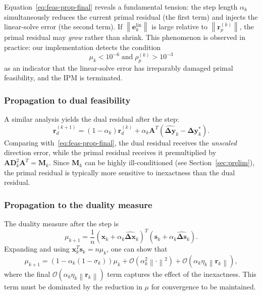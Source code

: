 \documentclass[11pt,twoside]{article}
\newcommand{\bA}{\mathbf{A}}
\newcommand{\bx}{\mathbf{x}}
\newcommand{\by}{\mathbf{y}}
\newcommand{\bs}{\mathbf{s}}
\newcommand{\bD}{\mathbf{D}}
\newcommand{\be}{\mathbf{e}}
\newcommand{\bM}{\mathbf{M}}
\newcommand{\br}{\mathbf{r}}
\newcommand{\bDelta}{\mathbf{\Delta}}
\newcommand{\cO}{\mathcal{O}}
\newcommand{\norm}[1]{\left\lVert#1\right\rVert}
\begin{document}
Equation~\eqref{eq:feas-prop-final} reveals a fundamental tension: the
step length $\alpha_k$ simultaneously reduces the current primal residual
(the first term) and injects the linear-solve error (the second term).
If $\norm{\be_k^{\text{lin}}}$ is large relative to $\norm{\br_p^{(k)}}$,
the primal residual may \emph{grow} rather than shrink.  This phenomenon is
observed in practice: our implementation detects the condition
\begin{equation}
  \mu_k < 10^{-6} \;\text{and}\; \rho_p^{(k)} > 10^{-3}
  \label{eq:feas-loss}
\end{equation}
as an indicator that the linear-solve error has irreparably damaged primal
feasibility, and the IPM is terminated.

\subsubsection{Propagation to dual feasibility}

A similar analysis yields the dual residual after the step:
\begin{equation}
  \br_d^{(k+1)} =
    (1 - \alpha_k)\br_d^{(k)}
    + \alpha_k \bA^T(\widehat{\bDelta\by}_k - \bDelta\by_k^*).
  \label{eq:dual-prop}
\end{equation}
Comparing with~\eqref{eq:feas-prop-final}, the dual residual receives the
\emph{unscaled} direction error, while the primal residual receives it
premultiplied by $\bA\bD_k^2\bA^T = \bM_k$.  Since $\bM_k$ can be highly
ill-conditioned (see Section~\ref{sec:prelim}), the primal residual is
typically more sensitive to inexactness than the dual residual.

\subsubsection{Propagation to the duality measure}

The duality measure after the step is
\begin{equation}
  \mu_{k+1} = \frac{1}{n}
    (\bx_k + \alpha_k\widehat{\bDelta\bx}_k)^T
    (\bs_k + \alpha_k\widehat{\bDelta\bs}_k).
  \label{eq:mu-prop}
\end{equation}
Expanding and using $\bx_k^T\bs_k = n\mu_k$, one can show that
\begin{equation}
  \mu_{k+1} = (1 - \alpha_k(1 - \sigma_k))\mu_k
    + \cO(\alpha_k^2\norm{\cdot}^2)
    + \cO(\alpha_k \eta_k \norm{\br_k}),
  \label{eq:mu-prop-expanded}
\end{equation}
where the final $\cO(\alpha_k \eta_k \norm{\br_k})$ term captures the
effect of the inexactness.  This term must be dominated by the reduction
in $\mu$ for convergence to be maintained.
\end{document}
